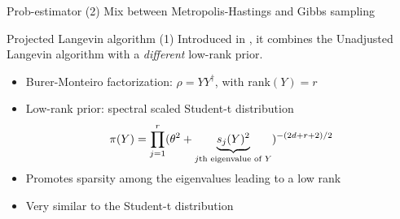 \documentclass{beamer}
\begin{document}
\begin{frame}{Prob-estimator (2)}
    Mix between Metropolis-Hastings and Gibbs sampling\medbreak
    
\begin{algorithm}[H]

    \DontPrintSemicolon


    \caption{Prob-estimator algorithm}

\end{algorithm}\medbreak

\end{frame}
\begin{frame}{Projected Langevin algorithm (1)}
    Introduced in \cite{ACMT2024}, it combines the Unadjusted Langevin algorithm with a \textit{different} low-rank prior.
    \begin{itemize}
        \item Burer-Monteiro factorization: $\rho = YY^\dagger$, with rank$(Y)=r$ 
        \item Low-rank prior: spectral scaled Student-t distribution
        \begin{equation}
            \pi(Y) = \prod_{j=1}^r (\theta^2 + \smash{\underbrace{s_j(Y)^2}_{j\text{th eigenvalue of } Y}})^{-(2d+r+2)/2}
        \end{equation}
        \item Promotes sparsity among the eigenvalues leading to a low rank
        \item Very similar to the Student-t distribution
  
    \end{itemize} 
\end{frame}
\end{document}
